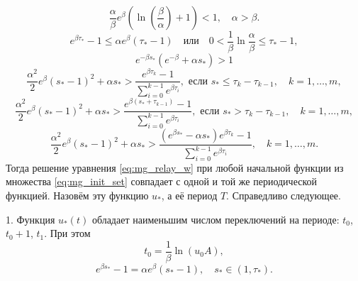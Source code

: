 \begin{equation}
	\label{eq:intro:cond_thm1}
	\frac{\alpha}{\beta}e^{\beta}\left(\ln\left(\frac{\beta}{\alpha}\right)+1\right) < 1,
	\quad
	\alpha > \beta.
\end{equation}
%
\begin{equation}
	\label{eq:intro:cond_thm2}
	e^{\beta \tau_*}-1 \leqslant \alpha e^\beta(\tau_*-1)
	\quad\text{или}\quad
	0 < \frac{1}{\beta}\ln\frac{\alpha}{\beta}\leqslant\tau_*-1,
\end{equation}
%
\begin{equation}
	\label{eq:intro:cond_th_w>1_t_1+1}
	e^{-\beta s_*}(e^{-\beta}+\alpha s_*)>1
\end{equation}
%
\begin{equation}
	\label{eq:intro:cond_hair_hair_01}
	\frac{\alpha^2}{2}e^\beta(s_*-1)^2+\alpha s_*>\frac{e^{\beta \tau_k}-1}{\sum_{i=0}^{k-1}e^{\beta \tau_i}},\text{ если } s_*\leqslant \tau_k-\tau_{k-1},\quad k=1,\ldots,m,
\end{equation}
%
\begin{equation}
	\label{eq:intro:cond_hair_hair_02}
	\frac{\alpha^2}{2}e^\beta(s_*-1)^2+\alpha s_*>\frac{e^{\beta (s_*+\tau_{k-1})}-1}{\sum_{i=0}^{k-1}e^{\beta \tau_i}},\text{ если } s_* > \tau_k-\tau_{k-1},\quad k=1,\ldots,m,
\end{equation}
%
\begin{equation}
	\label{eq:intro:cond_hair_hair_1}
	\frac{\alpha^2}{2}e^\beta( s_*-1)^2+\alpha s_*>\frac{(e^{\beta s_*}-\alpha s_*)e^{\beta \tau_k}-1}{\sum_{i=0}^{k-1}e^{\beta \tau_i}},\quad k=1,\ldots,m.
\end{equation}
Тогда решение уравнения \eqref{eq:mg_relay_w} при любой начальной функции из множества \eqref{eq:mg_init_set} совпадает с одной и той же периодической функцией. Назовём эту функцию $u_*$, а её период $T$. Справедливо следующее.

1. Функция $u_*(t)$ обладает наименьшим числом переключений на периоде: $t_0$, $t_0+1$, $t_1$. При этом 
%
\begin{equation*}
	t_0=\frac{1}{\beta}\ln(u_0 A),
\end{equation*}
\begin{equation}
	e^{\beta s_*} - 1=\alpha e^{\beta}(s_* - 1), \quad s_* \in (1, \tau_*).
\end{equation}


